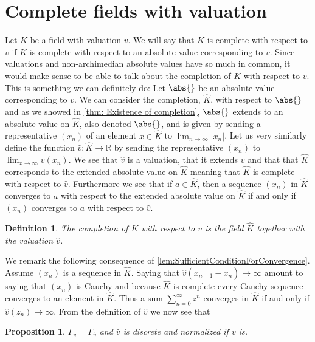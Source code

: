 \documentclass{article}
\newtheorem{definition}{Definition}[section]
\newtheorem{proposition}{Proposition}[section]
\newcommand{\mbb}[1]{\mathbb{#1}}
\numberwithin{equation}{section}
\begin{document}
\section{Complete fields with valuation}
Let $K$ be a field with valuation $v$. We will say that $K$ is complete with respect to $v$ if $K$ is complete with respect to an absolute value corresponding to $v$. Since valuations and non-archimedian absolute values have so much in common, it would make sense to be able to talk about the completion of $K$ with respect to $v$. This is something we can definitely do: Let $\abs{}$ be an absolute value corresponding to $v$. We can consider the completion, $\hat K$, with respect to $\abs{}$ and as we showed in \cref{thm: Existence of completion}, $\abs{}$ extends to an absolute value on $\hat K$, also denoted $\abs{}$, and is given by sending a representative $(x_n)$ of an element $x \in \hat K$ to $\lim_{n \to \infty} |x_n|$. Let us very similarly define the function $\hat v : \hat K \to \mbb R$ by sending the representative $(x_n)$ to $\lim_{x \to \infty} v(x_n)$. We see that $\hat v$ is a valuation, that it extends $v$ and that that $\hat K$ corresponds to the extended absolute value on $\hat K$ meaning that $\hat K$ is complete with respect to $\hat v$. Furthermore we see that if $a \in \hat K$, then a sequence $(x_n)$ in $\hat K$ converges to $a$ with respect to the extended absolute value on $\hat K$ if and only if $(x_n)$ converges to $a$ with respect to $\hat v$. 
\begin{definition}
    The completion of $K$ with respect to $v$ is the field $\hat K$ together with the valuation $\hat v$.
\end{definition}
We remark the following consequence of \cref{lem:SufficientConditionForConvergence}. Assume $(x_n)$ is a sequence in $\hat K$. Saying that $\hat v (x_{n+1} - x_n) \to \infty$ amount to saying that $(x_n)$ is Cauchy and because $\hat K$ is complete every Cauchy sequence converges to an element in $\hat K$. Thus a sum $\sum_{n = 0}^\infty z^n$ converges in $\hat K$ if and only if $\hat v(z_n) \to \infty$. From the definition of $\hat v$ we now see that
\begin{proposition}\label{K and completion of K have same value group}
    $\Gamma_v = \Gamma_{\hat v}$ and $\hat v$ is discrete and normalized if $v$ is.
\end{proposition}
\end{document}
